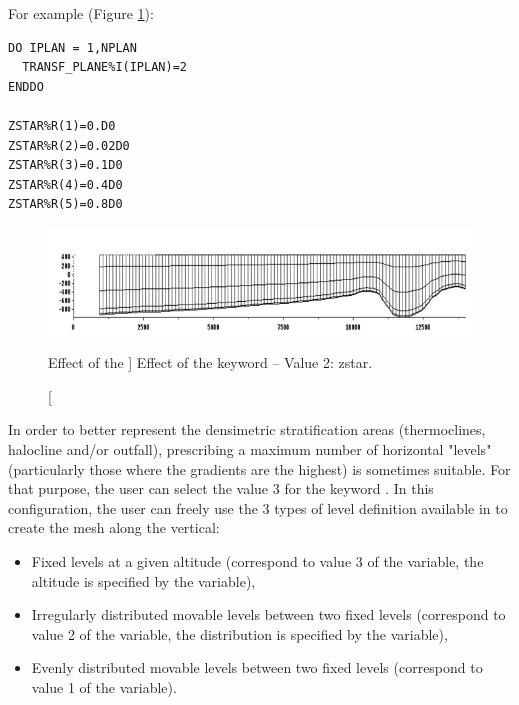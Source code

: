 For example (Figure \ref{fig:mesh_transf2}):

\begin{lstlisting}[language=TelFortran]
DO IPLAN = 1,NPLAN
  TRANSF_PLANE%I(IPLAN)=2
ENDDO

ZSTAR%R(1)=0.D0
ZSTAR%R(2)=0.02D0
ZSTAR%R(3)=0.1D0
ZSTAR%R(4)=0.4D0
ZSTAR%R(5)=0.8D0

\end{lstlisting}

\begin{figure}[H]%
\begin{center}
%
  \includegraphics[width=\textwidth]{./graphics/mesh_transformation2}
%
\end{center}
\caption
[Effect of the ]
{Effect of the  keyword -- Value 2: zstar.}
\label{fig:mesh_transf2}
\end{figure}

In order to better represent the densimetric stratification areas
(thermoclines, halocline and/or outfall), prescribing a maximum number of
horizontal "levels" (particularly those where the gradients are the highest) is
sometimes suitable. For that purpose, the user can select the value 3 for the
keyword . In this configuration, the user can
freely use the 3 types of level definition available in  to create
the mesh along the vertical:

\begin{itemize}
\item Fixed levels at a given altitude (correspond to value 3 of the
 variable, the altitude is specified by the
 variable),

\item Irregularly distributed movable levels between two fixed levels
(correspond to value 2 of the  variable,
the distribution is specified by the  variable),

\item Evenly distributed movable levels between two fixed levels (correspond
to value 1 of the  variable).
\end{itemize}

